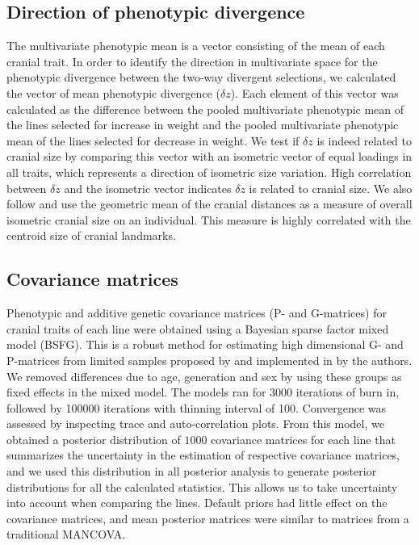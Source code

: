 \begin{refsection}
\subsection{Direction of phenotypic divergence}

The multivariate phenotypic mean is a vector consisting of the mean of
each cranial trait. In order to identify the direction in multivariate
space for the phenotypic divergence between the two-way divergent
selections, we calculated the vector of mean phenotypic divergence
(\(\delta z\)). Each element of this vector was calculated as the
difference between the pooled multivariate phenotypic mean of the lines
selected for increase in weight and the pooled multivariate phenotypic
mean of the lines selected for decrease in weight. We test if
\(\delta z\) is indeed related to cranial size by comparing this vector
with an isometric vector of equal loadings in all traits, which
represents a direction of isometric size variation. High correlation
between \(\delta z\) and the isometric vector indicates \(\delta z\) is
related to cranial size. We also follow \textcite{Mosimann1970-dz} and use the
geometric mean of the cranial distances as a measure of overall
isometric cranial size on an individual. This measure is highly
correlated with the centroid size of cranial landmarks.

\subsection{Covariance matrices}

Phenotypic and additive genetic covariance matrices (P- and G-matrices)
for cranial traits of each line were obtained using a Bayesian sparse
factor mixed model (BSFG). This is a robust method for estimating high
dimensional G- and P-matrices from limited samples proposed by
\textcite{Runcie2013-nr} and implemented in \textcite{Matlab2013-sd} by the authors. We removed
differences due to age, generation and sex by using these groups as
fixed effects in the mixed model. The models ran for 3000 iterations of
burn in, followed by 100000 iterations with thinning interval of 100.
Convergence was assessed by inspecting trace and auto-correlation plots.
From this model, we obtained a posterior distribution of \(1000\)
covariance matrices for each line that summarizes the uncertainty in the
estimation of respective covariance matrices, and we used this
distribution in all posterior analysis to generate posterior
distributions for all the calculated statistics. This allows us to take
uncertainty into account when comparing the lines. Default priors had
little effect on the covariance matrices, and mean posterior matrices
were similar to matrices from a traditional MANCOVA.


\end{refsection}
